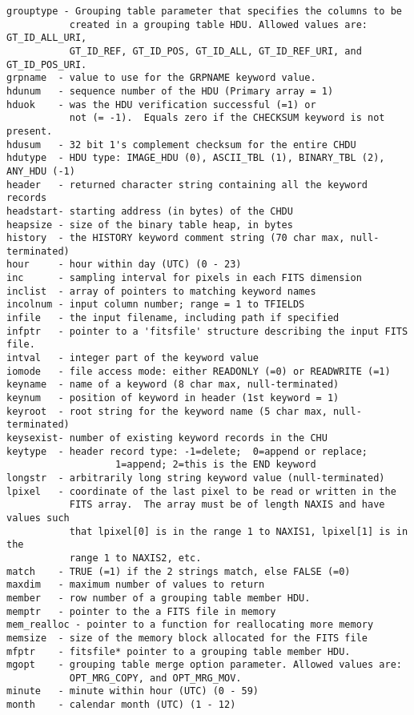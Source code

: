 \documentclass[11pt]{book}
\begin{document}
\begin{verbatim}
grouptype - Grouping table parameter that specifies the columns to be
           created in a grouping table HDU. Allowed values are: GT_ID_ALL_URI,
           GT_ID_REF, GT_ID_POS, GT_ID_ALL, GT_ID_REF_URI, and GT_ID_POS_URI.
grpname  - value to use for the GRPNAME keyword value.
hdunum   - sequence number of the HDU (Primary array = 1)
hduok    - was the HDU verification successful (=1) or
           not (= -1).  Equals zero if the CHECKSUM keyword is not present.
hdusum   - 32 bit 1's complement checksum for the entire CHDU
hdutype  - HDU type: IMAGE_HDU (0), ASCII_TBL (1), BINARY_TBL (2), ANY_HDU (-1)
header   - returned character string containing all the keyword records
headstart- starting address (in bytes) of the CHDU
heapsize - size of the binary table heap, in bytes
history  - the HISTORY keyword comment string (70 char max, null-terminated)
hour     - hour within day (UTC) (0 - 23)
inc      - sampling interval for pixels in each FITS dimension
inclist  - array of pointers to matching keyword names
incolnum - input column number; range = 1 to TFIELDS
infile   - the input filename, including path if specified
infptr   - pointer to a 'fitsfile' structure describing the input FITS file.
intval   - integer part of the keyword value
iomode   - file access mode: either READONLY (=0) or READWRITE (=1)
keyname  - name of a keyword (8 char max, null-terminated)
keynum   - position of keyword in header (1st keyword = 1)
keyroot  - root string for the keyword name (5 char max, null-terminated)
keysexist- number of existing keyword records in the CHU
keytype  - header record type: -1=delete;  0=append or replace;
                   1=append; 2=this is the END keyword
longstr  - arbitrarily long string keyword value (null-terminated)
lpixel   - coordinate of the last pixel to be read or written in the
           FITS array.  The array must be of length NAXIS and have values such
           that lpixel[0] is in the range 1 to NAXIS1, lpixel[1] is in the
           range 1 to NAXIS2, etc.
match    - TRUE (=1) if the 2 strings match, else FALSE (=0)
maxdim   - maximum number of values to return
member   - row number of a grouping table member HDU.
memptr   - pointer to the a FITS file in memory
mem_realloc - pointer to a function for reallocating more memory
memsize  - size of the memory block allocated for the FITS file
mfptr    - fitsfile* pointer to a grouping table member HDU.
mgopt    - grouping table merge option parameter. Allowed values are:
           OPT_MRG_COPY, and OPT_MRG_MOV.
minute   - minute within hour (UTC) (0 - 59)
month    - calendar month (UTC) (1 - 12)

\end{verbatim}
\end{document}
